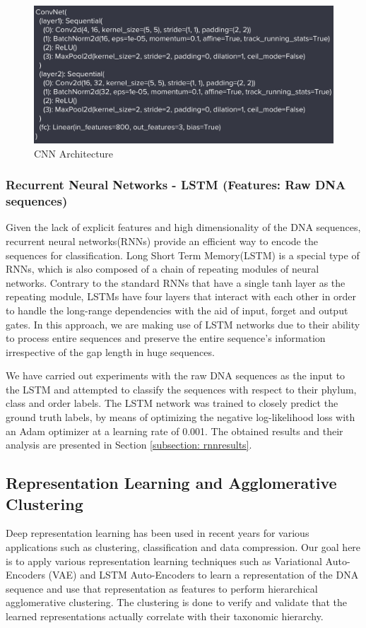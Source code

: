 \documentclass[12pt]{article}
\begin{document}
        \begin{figure}[h]
        \centering
        \includegraphics[scale=0.3]{cnn_arch.png}
        \caption{CNN Architecture}
        \label{fig:cnnarch}
        \end{figure}

        \subsubsection{Recurrent Neural Networks - LSTM (Features: Raw DNA sequences)}
        \label{subsection: rnn}
        Given the lack of explicit features and high dimensionality of the DNA sequences, recurrent neural networks(RNNs) provide an efficient way to encode the sequences for classification. Long Short Term Memory(LSTM) is a special type of RNNs, which is also composed of a chain of repeating modules of neural networks. Contrary to the standard RNNs that have a single tanh layer as the repeating module, LSTMs have four layers that interact with each other in order to handle the long-range dependencies with the aid of input, forget and output gates. In this approach, we are making use of LSTM networks due to their ability to process entire sequences and preserve the entire sequence's information irrespective of the gap length in huge sequences.

        We have carried out experiments with the raw DNA sequences as the input to the LSTM and attempted to classify the sequences with respect to their phylum, class and order labels. The LSTM network was trained to closely predict the ground truth labels, by means of optimizing the negative log-likelihood loss with an Adam optimizer at a learning rate of 0.001. The obtained results and their analysis are presented in Section \ref{subsection: rnnresults}.


        \subsection{Representation Learning and Agglomerative Clustering}
        Deep representation learning has been used in recent years for various applications such as clustering, classification and data compression. Our goal here is to apply various representation learning techniques such as Variational Auto-Encoders (VAE) and LSTM Auto-Encoders to learn a representation of the DNA sequence and use that representation as features to perform hierarchical agglomerative clustering. The clustering is done to verify and validate that the learned representations actually correlate with their taxonomic hierarchy.
\end{document}
